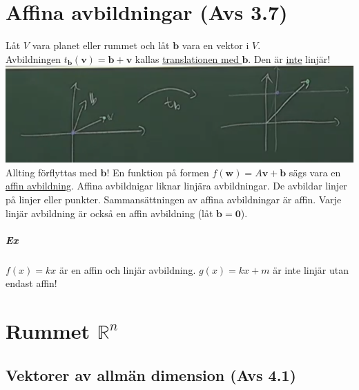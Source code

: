 \chapter{Affina avbildningar (Avs 3.7)}
Låt $V$ vara planet eller rummet och låt $\bm{b}$ vara en vektor i $V$.\\
Avbildningen $t_{\bm{b}}(\bm{v})=\bm{b}+\bm{v}$ kallas \underline{translationen med $\bm{b}$}.
Den är \underline{inte} linjär!\\
\includegraphics[scale=0.5]{imgs/img06.png}\\
Allting förflyttas med $\bm{b}$!
En funktion på formen $f(\bm{w})=A\bm{v}+\bm{b}$ sägs vara en \underline{affin avbildning}.
Affina avbildnigar liknar linjära avbildningar.
De avbildar linjer på linjer eller punkter.
Sammansättningen av affina avbildningar är affin.
Varje linjär avbildning är också en affin avbildning (låt $\bm{b}=\bm{0}$).

\paragraph{Ex} $f(x)=kx$ är en affin och linjär avbildning. 
$g(x)=kx+m$ är inte linjär utan endast affin!

\chapter{Rummet  $\mathbb{R}^{n}$}
\section{Vektorer av allmän dimension (Avs 4.1)}
